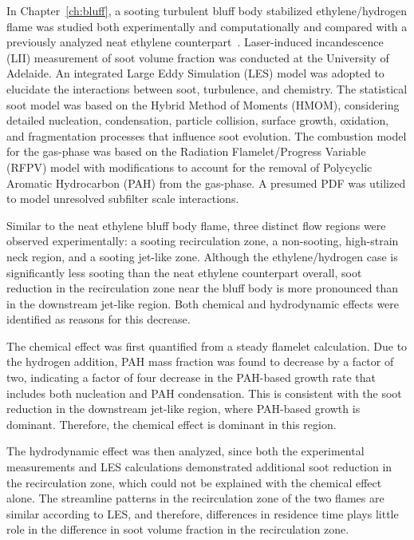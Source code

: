 In Chapter~\ref{ch:bluff}, a sooting turbulent bluff body stabilized ethylene/hydrogen flame was studied both experimentally and computationally and compared with a previously analyzed neat ethylene counterpart~\cite{mueller13}.  Laser-induced incandescence (LII) measurement of soot volume fraction was conducted at the University of Adelaide.  An integrated Large Eddy Simulation (LES) model was adopted to elucidate the interactions between soot, turbulence, and chemistry.  The statistical soot model was based on the Hybrid Method of Moments (HMOM), considering detailed nucleation, condensation, particle collision, surface growth, oxidation, and fragmentation processes that influence soot evolution.  The combustion model for the gas-phase was based on the Radiation Flamelet/Progress Variable (RFPV) model with modifications to account for the removal of Polycyclic Aromatic Hydrocarbon (PAH) from the gas-phase.  A presumed PDF was utilized to model unresolved subfilter scale interactions.

Similar to the neat ethylene bluff body flame, three distinct flow regions were observed experimentally: a sooting recirculation zone, a non-sooting, high-strain neck region, and a sooting jet-like zone.  Although the ethylene/hydrogen case is significantly less sooting than the neat ethylene counterpart overall, soot reduction in the recirculation zone near the bluff body is more pronounced than in the downstream jet-like region.  Both chemical and hydrodynamic effects were identified as reasons for this decrease.

The chemical effect was first quantified from a steady flamelet calculation.  Due to the hydrogen addition, PAH mass fraction was found to decrease by a factor of two, indicating a factor of four decrease in the PAH-based growth rate that includes both nucleation and PAH condensation.  This is consistent with the soot reduction in the downstream jet-like region, where PAH-based growth is dominant.  Therefore, the chemical effect is dominant in this region.

The hydrodynamic effect was then analyzed, since both the experimental measurements and LES calculations demonstrated additional soot reduction in the recirculation zone, which could not be explained with the chemical effect alone.  The streamline patterns in the recirculation zone of the two flames are similar according to LES, and therefore, differences in residence time plays little role in the difference in soot volume fraction in the recirculation zone.  

